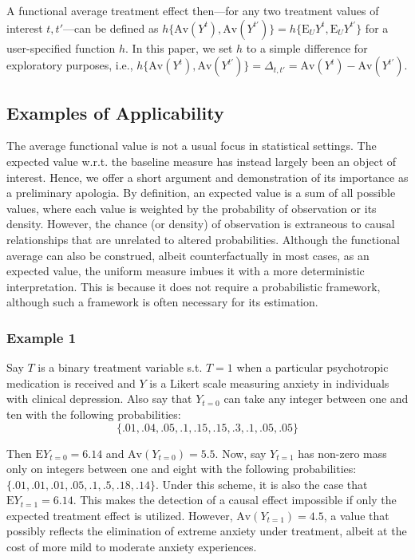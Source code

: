 \documentclass[12pt]{amsart}
\theoremstyle{plain}%
\theoremstyle{definition}
\theoremstyle{remark}
\numberwithin{equation}{section}
\begin{document}
A functional average treatment effect then---for any two treatment values of interest $t, t'$---can be defined as $h\{ \text{Av}(Y^t), \text{Av}(Y^{t'}) \} = h\{ \text{E}_U Y^t, \text{E}_UY^{t'} \}$ for a user-specified function $h$. In this paper, we set $h$ to a simple difference for exploratory purposes, i.e., $h\{ \text{Av}(Y^t), \text{Av}(Y^{t'}) \}= \Delta_{t, t'} =  \text{Av}(Y^t) - \text{Av}(Y^{t'})$.

\subsection{Examples of Applicability}

The average functional value is not a usual focus in statistical settings. The expected value w.r.t. the baseline measure has instead largely been an object of interest. Hence, we offer a short argument and demonstration of its importance as a preliminary apologia. By definition, an expected value is a sum of all possible values, where each value is weighted by the probability of observation or its density. However, the chance (or density) of observation is extraneous to causal relationships that are unrelated to altered probabilities. Although the functional average can also be construed, albeit counterfactually in most cases, as an expected value, the uniform measure imbues it with a more deterministic interpretation. This is because it does not require a probabilistic framework, although such a framework is often necessary for its estimation. 

\subsubsection{Example 1} Say $T$ is a binary treatment variable s.t. $T=1$ when a particular psychotropic medication is received and $Y$ is a Likert scale measuring anxiety in individuals with clinical depression. Also say that $Y_{t=0}$ can take any integer between one and ten with the following probabilities:
$$\{.01, .04, .05, .1, .15, .15, .3, .1, .05, .05 \}$$

Then $\text{E}Y_{t=0} = 6.14$ and $\text{Av}(Y_{t=0}) = 5.5$. Now, say $Y_{t=1}$ has non-zero mass only on integers between one and eight with the following probabilities: $\{.01, .01, .01, .05, .1, .5, .18, .14\}$. Under this scheme, it is also the case that $\text{E}Y_{t=1} = 6.14$. This makes the detection of a causal effect impossible if only the expected treatment effect is utilized. However, $\text{Av}(Y_{t=1}) = 4.5$, a value that possibly reflects the elimination of extreme anxiety under treatment, albeit at the cost of more mild to moderate anxiety experiences.
\end{document}
